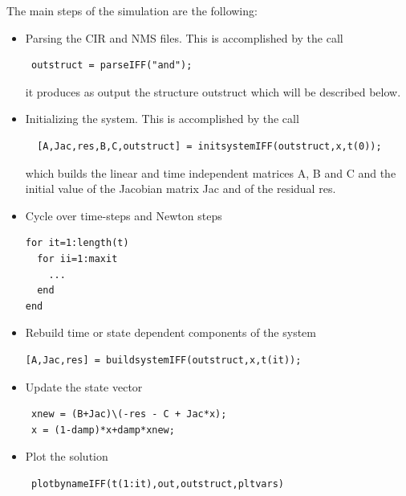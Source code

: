 \documentclass{scrartcl}
\let\tt=\normalfont\ttfamily
\newcommand{\cir}{{\tt CIR}}
\newcommand{\nms}{{\tt NMS}}
\begin{document}
The main steps of the simulation are the following:

\begin{itemize}
\item Parsing the {\cir} and {\nms} files. This is accomplished by the call
\begin{lstlisting}
 outstruct = parseIFF("and");
\end{lstlisting}
it produces as output the structure {\tt outstruct } which will be described below.
\item Initializing the system. This is accomplished by the call
\begin{lstlisting}
  [A,Jac,res,B,C,outstruct] = initsystemIFF(outstruct,x,t(0));
\end{lstlisting}
which builds the linear and time independent matrices  {\tt A},  {\tt B} 
and  {\tt C} and the initial value
of the Jacobian matrix  {\tt Jac} and of the residual  {\tt res}.
\item Cycle over time-steps and Newton steps
\begin{lstlisting}
for it=1:length(t) 
  for ii=1:maxit
    ...
  end
end
\end{lstlisting}
\item Rebuild time or state dependent components of the system
\begin{lstlisting}
[A,Jac,res] = buildsystemIFF(outstruct,x,t(it));
\end{lstlisting}
\item Update the state vector 
\begin{lstlisting}
 xnew = (B+Jac)\(-res - C + Jac*x);
 x = (1-damp)*x+damp*xnew;
\end{lstlisting}
\item Plot the solution
\begin{lstlisting}
 plotbynameIFF(t(1:it),out,outstruct,pltvars)
\end{lstlisting}
\end{itemize}
\end{document}
